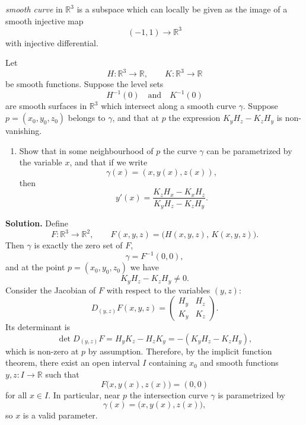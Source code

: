 \documentclass[12pt,a4paper]{article}
\theoremstyle{plain}
\theoremstyle{definition}      %
\begin{document}
	 \emph{smooth curve} in $\mathbb{R}^3$ is a subspace which can locally be
	given as the image of a smooth injective map
	\[
	(-1,1) \to \mathbb{R}^3
	\]
	with injective differential.
	
	Let
	\[
	H : \mathbb{R}^3 \to \mathbb{R}, \qquad
	K : \mathbb{R}^3 \to \mathbb{R}
	\]
	be smooth functions.
	Suppose the level sets
	\[
	H^{-1}(0) \quad\text{and}\quad K^{-1}(0)
	\]
	are smooth surfaces in $\mathbb{R}^3$ which intersect along a smooth curve
	$\gamma$.
	Suppose $p = (x_0,y_0,z_0)$ belongs to $\gamma$, and that at $p$ the expression
	$K_y H_z - K_z H_y$ is non-vanishing.
	
	\begin{enumerate}[label=\textnormal{(\alph*)}]
		\item Show that in some neighbourhood of $p$ the curve $\gamma$ can be
		parametrized by the variable $x$, and that if we write
		\[
		\gamma(x) = (x,y(x),z(x)),
		\]
		then
		\[
		y'(x) = \frac{K_z H_x - K_x H_z}{K_y H_z - K_z H_y}.
		\]
	\end{enumerate}
	
	\medskip
	
	\textbf{Solution.}
	Define
	\[
	F : \mathbb{R}^3 \to \mathbb{R}^2, \qquad
	F(x,y,z) = \bigl(H(x,y,z),\,K(x,y,z)\bigr).
	\]
	Then $\gamma$ is exactly the zero set of $F$,
	\[
	\gamma = F^{-1}(0,0),
	\]
	and at the point $p=(x_0,y_0,z_0)$ we have
	\[
	K_y H_z - K_z H_y \neq 0.
	\]
	Consider the Jacobian of $F$ with respect to the variables $(y,z)$:
	\[
	D_{(y,z)}F(x,y,z)
	=
	\begin{pmatrix}
		H_y & H_z \\
		K_y & K_z
	\end{pmatrix}.
	\]
	Its determinant is
	\[
	\det D_{(y,z)}F
	= H_y K_z - H_z K_y
	= -(K_y H_z - K_z H_y),
	\]
	which is non-zero at $p$ by assumption.  Therefore, by the implicit function
	theorem, there exist an open interval $I$ containing $x_0$ and smooth
	functions $y,z : I \to \mathbb{R}$ such that
	\[
	F\bigl(x,y(x),z(x)\bigr) = (0,0)
	\]
	for all $x\in I$.  In particular, near $p$ the intersection curve $\gamma$ is
	parametrized by
	\[
	\gamma(x) = \bigl(x,y(x),z(x)\bigr),
	\]
	so $x$ is a valid parameter.
	
\end{document}
